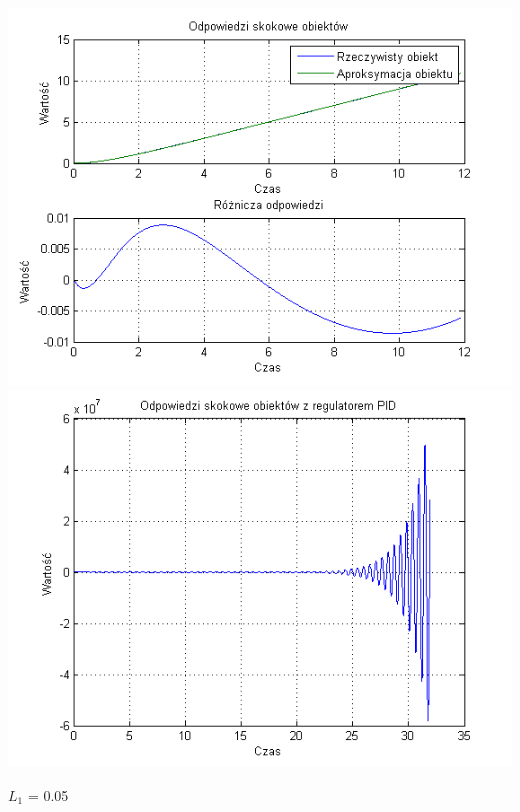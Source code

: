 \documentclass[10pt,a4paper]{article}
\begin{document}
\begin{center}
\includegraphics[scale=1]{images/dwa/skrypt_137.png}\\
\includegraphics[scale=1]{images/dwa/skrypt_138.png}\\
\end{center}
\newpage
$L_1$ = 0.05
\end{document}
